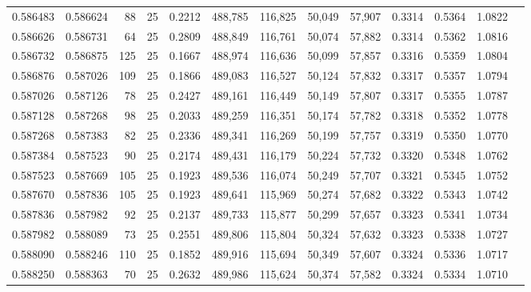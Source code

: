 \begin{tabular}{rrrrrrrrrrrrr}
0.586483 & 0.586624 &    88 &  25 &                                     0.2212 & 488,785 & 116,825 &  50,049 &  57,907 & 0.3314 & 0.5364 & 1.0822 \\
0.586626 & 0.586731 &    64 &  25 &                                     0.2809 & 488,849 & 116,761 &  50,074 &  57,882 & 0.3314 & 0.5362 & 1.0816 \\
0.586732 & 0.586875 &   125 &  25 &                                     0.1667 & 488,974 & 116,636 &  50,099 &  57,857 & 0.3316 & 0.5359 & 1.0804 \\
0.586876 & 0.587026 &   109 &  25 &                                     0.1866 & 489,083 & 116,527 &  50,124 &  57,832 & 0.3317 & 0.5357 & 1.0794 \\
0.587026 & 0.587126 &    78 &  25 &                                     0.2427 & 489,161 & 116,449 &  50,149 &  57,807 & 0.3317 & 0.5355 & 1.0787 \\
0.587128 & 0.587268 &    98 &  25 &                                     0.2033 & 489,259 & 116,351 &  50,174 &  57,782 & 0.3318 & 0.5352 & 1.0778 \\
0.587268 & 0.587383 &    82 &  25 &                                     0.2336 & 489,341 & 116,269 &  50,199 &  57,757 & 0.3319 & 0.5350 & 1.0770 \\
0.587384 & 0.587523 &    90 &  25 &                                     0.2174 & 489,431 & 116,179 &  50,224 &  57,732 & 0.3320 & 0.5348 & 1.0762 \\
0.587523 & 0.587669 &   105 &  25 &                                     0.1923 & 489,536 & 116,074 &  50,249 &  57,707 & 0.3321 & 0.5345 & 1.0752 \\
0.587670 & 0.587836 &   105 &  25 &                                     0.1923 & 489,641 & 115,969 &  50,274 &  57,682 & 0.3322 & 0.5343 & 1.0742 \\
0.587836 & 0.587982 &    92 &  25 &                                     0.2137 & 489,733 & 115,877 &  50,299 &  57,657 & 0.3323 & 0.5341 & 1.0734 \\
0.587982 & 0.588089 &    73 &  25 &                                     0.2551 & 489,806 & 115,804 &  50,324 &  57,632 & 0.3323 & 0.5338 & 1.0727 \\
0.588090 & 0.588246 &   110 &  25 &                                     0.1852 & 489,916 & 115,694 &  50,349 &  57,607 & 0.3324 & 0.5336 & 1.0717 \\
0.588250 & 0.588363 &    70 &  25 &                                     0.2632 & 489,986 & 115,624 &  50,374 &  57,582 & 0.3324 & 0.5334 & 1.0710 \\

\end{tabular}
